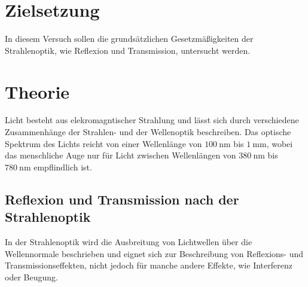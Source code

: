 \section{Zielsetzung}
In diesem Versuch sollen die grundsätzlichen Gesetzmäßigkeiten der Strahlenoptik, wie Reflexion und Transmission,
untersucht werden.

\section{Theorie}
\label{sec:Theorie}
Licht besteht aus elekromagntischer Strahlung und lässt sich durch verschiedene Zusammenhänge der Strahlen- und der Wellenoptik beschreiben.
Das optische Spektrum des Lichts reicht von einer Wellenlänge von $\qty{100}{\nano\metre}$ bis $\qty{1}{\milli\metre}$, wobei
das menschliche Auge nur für Licht zwischen Wellenlängen von $\qty{380}{\nano\metre}$ bis $\qty{780}{\nano\metre}$ 
empflindlich ist.

\subsection{Reflexion und Transmission nach der Strahlenoptik}
In der Strahlenoptik wird die Ausbreitung von Lichtwellen über die Wellennormale beschrieben und eignet sich zur Beschreibung
von Reflexions- und Transmissionseffekten, nicht jedoch für manche andere Effekte, wie Interferenz oder Beugung. 

